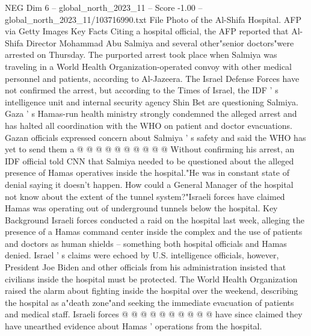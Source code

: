 \begin{textsample}{NEG Dim 6 – global\_north\_2023\_11 – Score -1.00 – global\_north\_2023\_11/103716990.txt}
File Photo of the Al-Shifa Hospital.
AFP via Getty Images Key Facts Citing a hospital official, the AFP reported that Al-Shifa Director Mohammad Abu Salmiya and several other"senior doctors"were arrested on Thursday.
The purported arrest took place when Salmiya was traveling in a World Health Organization-operated convoy with other medical personnel and patients, according to Al-Jazeera.
The Israel Defense Forces have not confirmed the arrest, but according to the Times of Israel, the IDF ' s intelligence unit and internal security agency Shin Bet are questioning Salmiya.
Gaza ' s Hamas-run health ministry strongly condemned the alleged arrest and has halted all coordination with the WHO on patient and doctor evacuations.
Gazan officials expressed concern about Salmiya ' s safety and said the WHO has yet to send them a @ @ @ @ @ @ @ @ @ @ Without confirming his arrest, an IDF official told CNN that Salmiya needed to be questioned about the alleged presence of Hamas operatives inside the hospital."He was in constant state of denial saying it doesn't happen.
How could a General Manager of the hospital not know about the extent of the tunnel system?"Israeli forces have claimed Hamas was operating out of underground tunnels below the hospital.
Key Background Israeli forces conducted a raid on the hospital last week, alleging the presence of a Hamas command center inside the complex and the use of patients and doctors as human shields -- something both hospital officials and Hamas denied.
Israel ' s claims were echoed by U.S. intelligence officials, however, President Joe Biden and other officials from his administration insisted that civilians inside the hospital must be protected.
The World Health Organization raised the alarm about fighting inside the hospital over the weekend, describing the hospital as a"death zone"and seeking the immediate evacuation of patients and medical staff.
Israeli forces @ @ @ @ @ @ @ @ @ @ have since claimed they have unearthed evidence about Hamas ' operations from the hospital.

\end{textsample}
